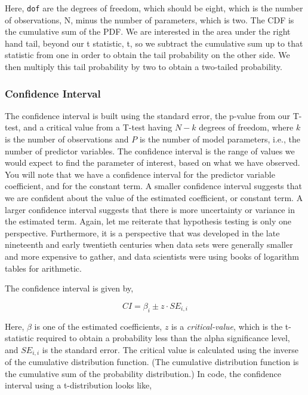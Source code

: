 Here, \lstinline{dof} are the degrees of freedom, which should be eight, which is the number of observations, N, minus the number of parameters, which is two. The CDF is the cumulative sum of the PDF. We are interested in the area under the right hand tail, beyond our t statistic, t, so we subtract the cumulative sum up to that statistic from one in order to obtain the tail probability on the other side. We then multiply this tail probability by two to obtain a two-tailed probability.

\subsubsection{Confidence Interval}

The confidence interval is built using the standard error, the p-value from our T-test, and a critical value from a T-test having $N-k$ degrees of freedom, where $k$ is the number of observations and $P$ is the number of model parameters, i.e., the number of predictor variables. The confidence interval is the range of values we would expect to find the parameter of interest, based on what we have observed. You will note that we have a confidence interval for the predictor variable coefficient, and for the constant term. A smaller confidence interval suggests that we are confident about the value of the estimated coefficient, or constant term. A larger confidence interval suggests that there is more uncertainty or variance in the estimated term. Again, let me reiterate that hypothesis testing is only one perspective. Furthermore, it is a perspective that was developed in the late nineteenth and early twentieth centuries when data sets were generally smaller and more expensive to gather, and data scientists were using books of logarithm tables for arithmetic.

The confidence interval is given by,

\begin{equation}
    CI =  \beta_{i} \pm z \cdot SE_{i,i}
\end{equation}

Here, $\beta$ is one of the estimated coefficients, $z$ is a \emph{critical-value}, which is the t-statistic required to obtain a probability less than the alpha significance level, and $SE_{i,i}$ is the standard error. The critical value is calculated using the inverse of the cumulative distribution function. (The cumulative distribution function is the cumulative sum of the probability distribution.) In code, the confidence interval using a t-distribution looks like,

